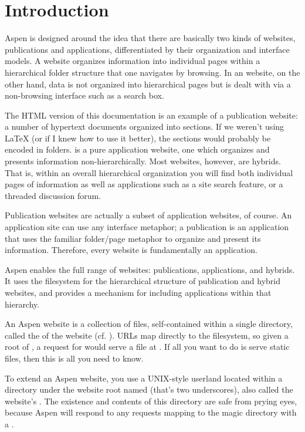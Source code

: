 \chapter{Introduction \label{introduction}}

Aspen is designed around the idea that there are basically two kinds of
websites, publications and applications, differentiated by their organization
and interface models. A  website organizes information into
individual pages within a hierarchical folder structure that one navigates by
browsing. In an  website, on the other hand, data is not
organized into hierarchical pages but is dealt with via a non-browsing interface
such as a search box.

The HTML version of this documentation is an example of a publication website: a
number of hypertext documents organized into sections. If we weren't using LaTeX
(or if I knew how to use it better), the sections would probably be encoded in
folders.  is a pure application
website, one which organizes and presents information non-hierarchically. Most
websites, however, are hybrids. That is, within an overall hierarchical
organization you will find both individual pages of information as well as
applications such as a site search feature, or a threaded discussion forum.

Publication websites are actually a subset of application websites, of course.
An application site can use any interface metaphor; a publication is an
application that uses the familiar folder/page metaphor to organize and present
its information. Therefore, every website is fundamentally an application.

Aspen enables the full range of websites: publications, applications, and
hybrids. It uses the filesystem for the hierarchical structure of publication
and hybrid websites, and provides a mechanism for including applications within
that hierarchy.

An Aspen website is a collection of files, self-contained within a single
directory, called the  of the website (cf. ). URLs
map directly to the filesystem, so given a root of
, a request for  would serve a
file at . If all you want to do is
serve static files, then this is all you need to know.

To extend an Aspen website, you use a UNIX-style userland located within a
directory under the website root named \dfn{__} (that's two underscores), also
called the website's . The existence and contents of this
directory are safe from prying eyes, because Aspen will respond to any requests
mapping to the magic directory with a .
